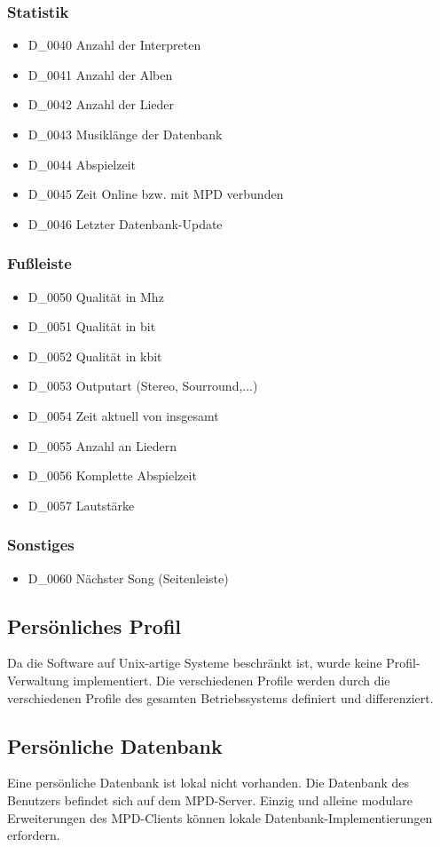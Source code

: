 \subsubsection{Statistik}
\begin{itemize}
        \item D\_0040 Anzahl der Interpreten
        \item D\_0041 Anzahl der Alben
        \item D\_0042 Anzahl der Lieder
        \item D\_0043 Musiklänge der Datenbank
        \item D\_0044 Abspielzeit
        \item D\_0045 Zeit Online bzw. mit MPD verbunden
	\item D\_0046 Letzter Datenbank-Update
\end{itemize}
\subsubsection{Fußleiste}
\begin{itemize}
	\item D\_0050 Qualität in Mhz
	\item D\_0051 Qualität in bit
	\item D\_0052 Qualität in kbit
	\item D\_0053 Outputart (Stereo, Sourround,...)
	\item D\_0054 Zeit aktuell von insgesamt
	\item D\_0055 Anzahl an Liedern
	\item D\_0056 Komplette Abspielzeit
	\item D\_0057 Lautstärke
\end{itemize}
\subsubsection{Sonstiges}
\begin{itemize}
	\item D\_0060 Nächster Song (Seitenleiste)
\end{itemize}
\subsection{Persönliches Profil}
Da die Software auf Unix-artige Systeme beschränkt ist, wurde keine Profil-Verwaltung implementiert. Die
verschiedenen Profile werden durch die verschiedenen Profile des gesamten Betriebssystems definiert und differenziert.
\subsection{Persönliche Datenbank}
Eine persönliche Datenbank ist lokal nicht vorhanden. Die Datenbank des Benutzers befindet sich auf dem MPD-Server.
Einzig und alleine modulare Erweiterungen des MPD-Clients können lokale Datenbank-Implementierungen erfordern.
